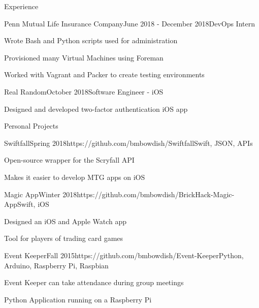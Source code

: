 \documentclass{resume} %
\begin{document}

\begin{rSection}{Experience}

\begin{rSubsection}{Penn Mutual Life Insurance Company}{June 2018 - December 2018}{DevOps Intern}{}
\item Wrote Bash and Python scripts used for administration
\item Provisioned many Virtual Machines using Foreman 
\item Worked with Vagrant and Packer to create testing environments
\end{rSubsection}



\begin{rSubsection}{Real Random}{October 2018}{Software Engineer - iOS}{}
\item Designed and developed two-factor authentication iOS app
\end{rSubsection}

\end{rSection}



\begin{rSection}{Personal Projects} \itemsep -2pt
\begin{rSubsection}{Swiftfall}{Spring 2018}{https://github.com/bmbowdish/Swiftfall}{Swift, JSON, APIs}
\item Open-source wrapper for the Scryfall API
\item Makes it easier to develop MTG apps on iOS
\end{rSubsection}
\begin{rSubsection}{Magic App}{Winter 2018}{https://github.com/bmbowdish/BrickHack-Magic-App}{Swift, iOS}
\item Designed an iOS and Apple Watch app
\item Tool for players of trading card games
\end{rSubsection}
\begin{rSubsection}{Event Keeper}{Fall 2015}{https://github.com/bmbowdish/Event-Keeper}{Python, Arduino, Raspberry Pi, Raspbian}
\item Event Keeper can take attendance during group meetings
\item Python Application running on a Raspberry Pi
\end{rSubsection}
\end{rSection}
\end{document}
